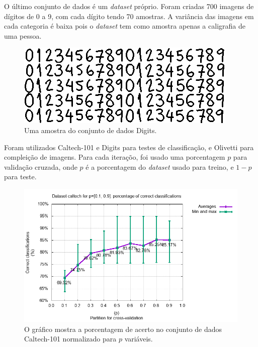\documentclass[12pt]{article}
\theoremstyle{plain}
\numberwithin{equation}{section}
\begin{document}
O último conjunto de dados é um \textit{dataset} próprio. Foram criadas 700 imagens de dígitos de 0
a 9, com cada dígito tendo 70 amostras. A variância das imagens em cada categoria é baixa pois o
\textit{dataset} tem como amostra apenas a caligrafia de uma pessoa.

\begin{figure}[h]
  \centering\includegraphics[scale=0.8]{imgs/digits_sample.png}
  \caption{Uma amostra do conjunto de dados Digits.}
\end{figure}

Foram utilizados Caltech-101 e Digits para testes de classificação, e Olivetti para compleição de
imagens. Para cada iteraçõo, foi usado uma porcentagem $p$ para validação cruzada, onde $p$ é a
porcentagem do \textit{dataset} usado para treino, e $1-p$ para teste.

\begin{figure}[h]
  \centering\includegraphics[scale=0.75]{imgs/caltech_percs.png}
  \captionsetup{justification=raggedright}
  \caption{O gráfico mostra a porcentagem de acerto no conjunto de dados Caltech-101 normalizado
  para $p$ variáveis.}
\end{figure}
\end{document}
